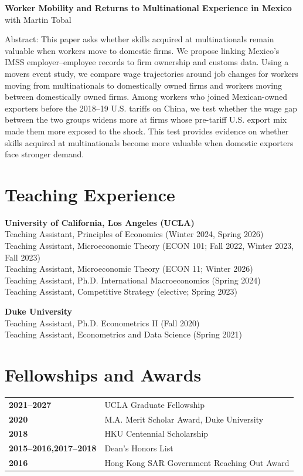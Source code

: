 \documentclass[11pt,letterpaper]{article}
\begin{document}
\par\addvspace{15pt}\textbf{Worker Mobility and Returns to Multinational Experience in Mexico} with Martin Tobal\par\nopagebreak\vspace{2pt}\nopagebreak
Abstract: This paper asks whether skills acquired at multinationals remain valuable when workers move to domestic firms. We propose linking Mexico’s IMSS employer–employee records to firm ownership and customs data. Using a movers event study, we compare wage trajectories around job changes for workers moving from multinationals to domestically owned firms and workers moving between domestically owned firms. Among workers who joined Mexican-owned exporters before the 2018–19 U.S. tariffs on China, we test whether the wage gap between the two groups widens more at firms whose pre-tariff U.S. export mix made them more exposed to the shock. This test provides evidence on whether skills acquired at multinationals become more valuable when domestic exporters face stronger demand.
\newpage
\fontsize{10.5}{11.85}\selectfont
\section*{Teaching Experience}
\textbf{University of California, Los Angeles (UCLA)}\\
Teaching Assistant, Principles of Economics (Winter 2024, Spring 2026)\\
Teaching Assistant, Microeconomic Theory (ECON 101; Fall 2022, Winter 2023, Fall 2023)\\
Teaching Assistant, Microeconomic Theory (ECON 11; Winter 2026)\\
Teaching Assistant, Ph.D. International Macroeconomics (Spring 2024)\\
Teaching Assistant, Competitive Strategy (elective; Spring 2023)

\textbf{Duke University}\\
Teaching Assistant, Ph.D. Econometrics II (Fall 2020)\\
Teaching Assistant, Econometrics and Data Science (Spring 2021)
\section*{Fellowships and Awards}
\begin{tabularx}{\linewidth}{@{}p{1.24in}X@{}}
\textbf{2021--2027}&UCLA Graduate Fellowship\\[2pt]
\textbf{2020}&M.A. Merit Scholar Award, Duke University\\[2pt]
\textbf{2018}&HKU Centennial Scholarship\\[2pt]
\textbf{2015--2016,}\newline\textbf{2017--2018}&Dean's Honors List\\[6pt]
\textbf{2016}&Hong Kong SAR Government Reaching Out Award
\end{tabularx}\par\vspace{2pt}
\end{document}
